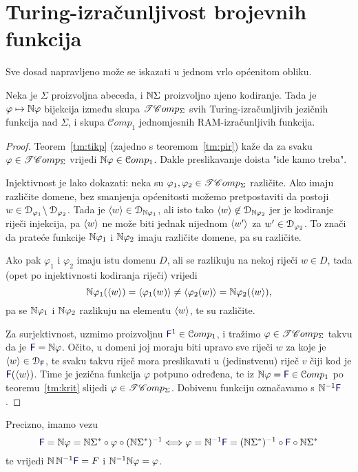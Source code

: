 \section{Turing-izračunljivost brojevnih funkcija}


Sve dosad napravljeno može se iskazati u jednom vrlo općenitom obliku.

\begin{propozicija}\label{pp:trackbij}
Neka je $\Sigma$ proizvoljna abeceda, i ${\mathbb N}\Sigma$ proizvoljno njeno kodiranje. Tada je $\varphi\mapsto{\mathbb N}\varphi$ bijekcija između skupa $\mathscr{TC}omp_\Sigma$ svih Turing-izračunljivih jezičnih funkcija nad $\Sigma$, i skupa $\mathcal Comp_1$ jednomjesnih RAM-izračunljivih funkcija.
\end{propozicija}

\begin{proof}
Teorem~\ref{tm:tikp} (zajedno s teoremom~\ref{tm:pir}) kaže da za svaku $\varphi\in\mathscr{TC}omp_\Sigma$ vrijedi ${\mathbb N}\varphi\in\mathcal Comp_1$. Dakle preslikavanje doista "ide kamo treba".

Injektivnost je lako dokazati: neka su $\varphi_1,\varphi_2\in\mathscr{TC}omp_\Sigma$ različite. Ako imaju različite domene, bez smanjenja općenitosti možemo pretpostaviti da postoji $w\in\mathcal D_{\varphi_1}\!\setminus\mathcal D_{\varphi_2}$. Tada je $\langle w\rangle\in\mathcal D_{{\mathbb N}\varphi_1}$, ali isto tako $\langle w\rangle\not\in\mathcal D_{{\mathbb N}\varphi_2}$ jer je kodiranje riječi injekcija, pa $\langle w\rangle$ ne može biti jednak nijednom $\langle w'\rangle$ za $w'\in\mathcal D_{\varphi_2}$. To znači da prateće funkcije ${\mathbb N}\varphi_1$ i ${\mathbb N}\varphi_2$ imaju različite domene, pa su različite.

Ako pak $\varphi_1$ i $\varphi_2$ imaju istu domenu $D$, ali se razlikuju na nekoj riječi $w\in D$, tada (opet po injektivnosti kodiranja riječi) vrijedi
\begin{equation}
    {\mathbb N}\varphi_1(\langle w\rangle)=\langle\varphi_1(w)\rangle\not=\langle\varphi_2(w)\rangle={\mathbb N}\varphi_2(\langle w\rangle)\text,
\end{equation}
pa se ${\mathbb N}\varphi_1$ i ${\mathbb N}\varphi_2$ razlikuju na elementu $\langle w\rangle$, te su različite.

Za surjektivnost, uzmimo proizvoljnu $\f F^1\in\mathcal Comp_1$, i tražimo $\varphi\in\mathscr{TC}omp_\Sigma$ takvu da je $\f F=\N\varphi$. Očito, u domeni joj moraju biti upravo sve riječi $w$ za koje je $\kr w\in\dom{\f F}$, te svaku takvu riječ mora preslikavati u (jedinstvenu) riječ $v$ čiji kod je $\f F(\kr w)$. Time je jezična funkcija $\varphi$ potpuno određena, te iz $\N\varphi=\f F\in\mathcal Comp_1$ po teoremu~\ref{tm:krit} slijedi $\varphi\in\mathscr{TC}omp_\Sigma$. Dobivenu funkciju označavamo s $\N^{-1}\f F$.
\end{proof}
Precizno, imamo vezu
\begin{equation}
\f F=\N\varphi=\N\Sigma^*\circ\varphi\circ(\N\Sigma^*)^{-1}\Longleftrightarrow
\varphi=\N^{-1}\f F=(\N\Sigma^*)^{-1}\circ\f F\circ\N\Sigma^*
\end{equation}
te vrijedi $\N\,\N^{-1}\f F=F$ i ${\mathbb N}^{-1}{\mathbb N}\varphi=\varphi$.

